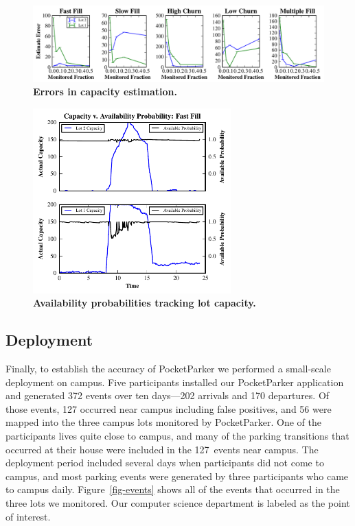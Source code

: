 \begin{figure}
\centering
\includegraphics[width=\textwidth]{./simulator/figures/capacity_experiment.pdf}

\caption{\textbf{Errors in capacity estimation.} }

\label{fig-capacityerrors}
\end{figure}

\begin{figure}
\centering
\includegraphics[width=3.0in]{./simulator/figures/tracking_fastfill.pdf}

\caption{\textbf{Availability probabilities tracking lot capacity.} }

\label{fig-trackingexample}
\end{figure}


\subsection{Deployment}

Finally, to establish the accuracy of PocketParker we performed a small-scale
deployment on campus. Five participants installed our PocketParker
application and generated 372 events over ten days---202 arrivals and 170
departures. Of those events, 127 occurred near campus including false
positives, and 56 were mapped into the three campus lots monitored by
PocketParker. One of the participants lives quite close to campus, and many
of the parking transitions that occurred at their house were included in the
127~events near campus. The deployment period included several days when
participants did not come to campus, and most parking events were generated
by three participants who came to campus daily. Figure~\ref{fig-events} shows
all of the events that occurred in the three lots we monitored. Our computer
science department is labeled as the point of interest.

